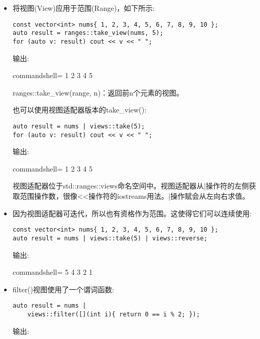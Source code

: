 \begin{itemize}
\item 
将视图(View)应用于范围(Range)，如下所示:

\begin{lstlisting}[style=styleCXX]
const vector<int> nums{ 1, 2, 3, 4, 5, 6, 7, 8, 9, 10 };
auto result = ranges::take_view(nums, 5);
for (auto v: result) cout << v << " ";
\end{lstlisting}

输出:

\begin{tcblisting}{commandshell={}}
1 2 3 4 5
\end{tcblisting}

ranges::take\_view(range, n)：返回前n个元素的视图。

也可以使用视图适配器版本的take\_view():

\begin{lstlisting}[style=styleCXX]
auto result = nums | views::take(5);
for (auto v: result) cout << v << " ";
\end{lstlisting}

输出:

\begin{tcblisting}{commandshell={}}
1 2 3 4 5
\end{tcblisting}

视图适配器位于std::ranges::views命名空间中。视图适配器从|操作符的左侧获取范围操作数，很像<{}<操作符的iostreams用法。|操作赋会从左向右求值。

\item 
因为视图适配器可迭代，所以也有资格作为范围。这使得它们可以连续使用:

\begin{lstlisting}[style=styleCXX]
const vector<int> nums{ 1, 2, 3, 4, 5, 6, 7, 8, 9, 10 };
auto result = nums | views::take(5) | views::reverse;
\end{lstlisting}

输出:

\begin{tcblisting}{commandshell={}}
5 4 3 2 1
\end{tcblisting}

\item 
filter()视图使用了一个谓词函数:

\begin{lstlisting}[style=styleCXX]
auto result = nums |
	views::filter([](int i){ return 0 == i % 2; });
\end{lstlisting}

输出:


\end{itemize}
